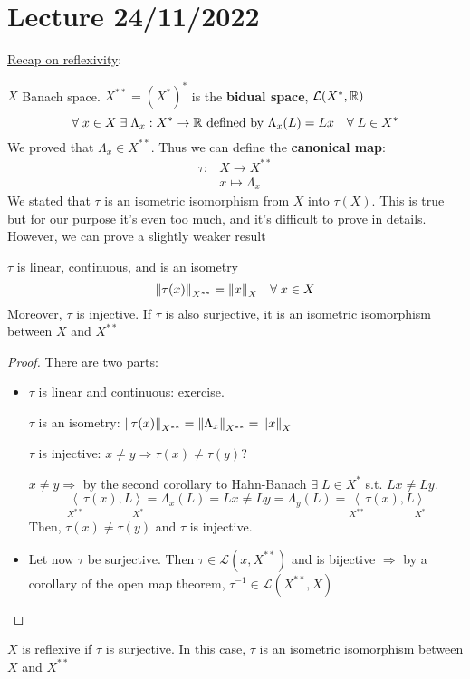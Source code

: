 \section{Lecture 24/11/2022}
\noindent\underline{Recap on reflexivity}:

\noindent\(X\) Banach space. \(X^{**} = (X^*)^*\) is the \textbf{bidual space}, \(\mathcal{L}(X^*, \mathbb{R})\)
\[
    \forall \; x \in X \; \exists \; \Lambda_x : X^* \to \mathbb{R} \mbox{ defined by } \Lambda_x(L) = Lx \quad \forall \; L \in X^*
\]
We proved that \(\Lambda_x \in X^{**}\). Thus we can define the \textbf{canonical map}:
\[
        \begin{array}{lc}
            \tau : & X \to X^{**} \\
            & x \mapsto \Lambda_x
        \end{array}
    \tag*{(Canonical Map)}
\]
We stated that \(\tau\) is an isometric isomorphism from \(X\) into \(\tau(X)\). This is true but for our purpose it's even too much, and it's difficult to prove in details. However, we can prove a slightly weaker result 
\begin{theorem}
    \(\tau\) is linear, continuous, and is an isometry
    \[
        \norm{\tau(x)}_{X^{**}} = \norm{x}_X \quad \forall \; x \in X
    \]
    Moreover, \(\tau\) is injective. If \(\tau\) is also surjective, it is an isometric isomorphism between \(X\) and \(X^{**}\)
\end{theorem}
\begin{proof}
    There are two parts:
    \begin{itemize}
        \item \(\tau\) is linear and continuous: exercise. 
        
        \noindent \(\tau\) is an isometry: \(\norm{\tau(x)}_{X^{**}} = \norm{\Lambda_x}_{X^{**}} = \norm{x}_X\)

        \noindent \(\tau\) is injective: \(x\neq y \Rightarrow \tau(x) \neq \tau(y)\)? 

        \noindent \(x \neq y \Rightarrow\) by the second corollary to Hahn-Banach \(\exists\; L \in X^*\) s.t. \(Lx \neq Ly\).
        \[
            \underset{X^{**}}{\langle}\tau(x), L \underset{X^*}{\rangle} = \Lambda_x(L) = Lx \neq Ly = \Lambda_y(L) = \underset{X^{**}}{\langle}\tau(x), L \underset{X^*}{\rangle}
        \]
        Then, \(\tau(x) \neq \tau(y)\) and \(\tau\) is injective.
        \item Let now \(\tau\) be surjective. Then \(\tau \in \mathcal{L}(x, X^{**})\) and is bijective \(\Rightarrow\) by a corollary of the open map theorem, \(\tau^{-1} \in \mathcal{L}(X^{**}, X)\)
    \end{itemize}
\end{proof}
\begin{definition}
    \(X\) is reflexive if \(\tau\) is surjective. In this case, \(\tau\) is an isometric isomorphism between \(X\) and \(X^{**}\)
\end{definition}

